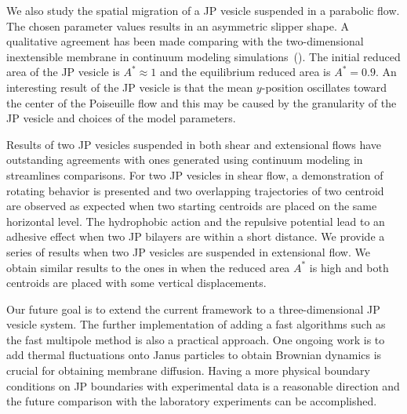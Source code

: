 \documentclass[lineno]{jfm}
\begin{document}
We also study the spatial migration of a JP vesicle suspended in a
parabolic flow. The chosen parameter values results in an asymmetric
slipper shape. A qualitative agreement has been made comparing with the
two-dimensional inextensible membrane in continuum modeling
simulations~(\cite{Kaoui09, dan-vla-mis2009, cou-kao-pod-mis2008}). The
initial reduced area of the JP vesicle is $A^* \approx 1$ and the
equilibrium reduced area is $A^*=0.9$. An interesting result of the JP
vesicle is that the mean $y$-position oscillates toward the center of
the Poiseuille flow and this may be caused by the granularity of the JP
vesicle and choices of the model parameters.

Results of two JP vesicles suspended in both shear and extensional flows
have outstanding agreements with ones generated using continuum modeling
in streamlines comparisons. For two JP vesicles in shear flow, a
demonstration of rotating behavior is presented and two overlapping
trajectories of two centroid are observed as expected when two starting
centroids are placed on the same horizontal level. The hydrophobic
action and the repulsive potential lead to an adhesive effect when two
JP bilayers are within a short distance. We provide a series of results
when two JP vesicles are suspended in extensional flow. We obtain
similar results to the ones in \cite{qua-vee-you2019} when the reduced
area $A^*$ is high and both centroids are placed with some vertical
displacements.

Our future goal is to extend the current framework to a
three-dimensional JP vesicle system. The further implementation of
adding a fast algorithms such as the fast multipole method is also a
practical approach. One ongoing work is to add thermal fluctuations onto
Janus particles to obtain Brownian dynamics is crucial for obtaining
membrane diffusion. Having a more physical boundary conditions on JP
boundaries with experimental data is a reasonable direction and the
future comparison with the laboratory experiments can be accomplished.



\begin{acknowledgments}
\end{acknowledgments}

%
\end{document}
